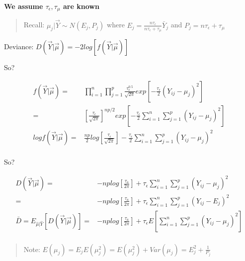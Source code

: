 \documentclass[11pt]{article}
\begin{document}
\begin{enumerate}
\begin{enumerate}
\textbf{We assume \(\tau_\epsilon, \tau_\mu\) are known}

\begin{quote}
Recall: \(\mu_j | \vec Y \sim N (E_j, P_j)\) where \(E_j = \frac{n \tau_\epsilon}{n
\tau_\epsilon + \tau_\mu} \bar Y_j\) and \(P_j = n \tau_\epsilon + \tau_\mu\)
\end{quote}

Deviance: \(D(\vec Y | \vec \mu) = -2 log[f(\vec Y | \vec \mu)]\)

So?

\begin{equation}
\begin{split}
f(\vec Y | \vec \mu) = & \prod_{i = 1}^{n} \prod_{j = 1}^{p} \frac{\tau_\epsilon^{0.5}}{\sqrt{2 \pi}} exp \left[ - \frac{\tau_\epsilon}{2} (Y_{ij} - \mu_j)^2 \right]\\
= & \left[\frac{\tau_\epsilon}{\sqrt{2 \pi}} \right]^{np/2} exp \left[ - \frac{\tau_\epsilon}{2} \sum_{i = 1}^{n} \sum_{j = 1}^{p} (Y_{ij} - \mu_j)^2 \right]\\
log f(\vec Y | \vec \mu) = & \frac{np}{2} log\left[\frac{\tau_\epsilon}{\sqrt{2 \pi}} \right]  - \frac{\tau_\epsilon}{2} \sum_{i = 1}^{n} \sum_{j = 1}^{p} (Y_{ij} - \mu_j)^2\\
\end{split}
\end{equation}

So?

\begin{equation}
\begin{split}
D(\vec Y | \vec \mu) = & -np log \left[ \frac{\tau_a}{2 \pi} \right] + \tau_\epsilon \sum_{i = 1}^{n} \sum_{j = 1}^{p} (Y_{ij} - \mu_j)^2\\
= & -np log \left[ \frac{\tau_a}{2 \pi} \right] + \tau_\epsilon \sum_{i = 1}^{n} \sum_{j = 1}^{p} (Y_{ij} - E_j)^2\\
\bar D =  E_{\hat \mu | \hat Y} [D(\vec Y | \vec \mu)] = & -np log \left[ \frac{\tau_a}{2 \pi} \right] + \tau_\epsilon E \left[ \sum_{i = 1}^{n} \sum_{j = 1}^{p} (Y_{ij} - \mu_j)^2 \right]\\
\end{split}
\end{equation}


\begin{quote}
Note: \(E(\mu_j) = E_j E(\mu_j^2) = E(\mu_j^2) + Var(\mu_j) = E_j^2 + \frac{1}{P_j}\)
\end{quote}


\end{enumerate}
\end{enumerate}
\end{document}
